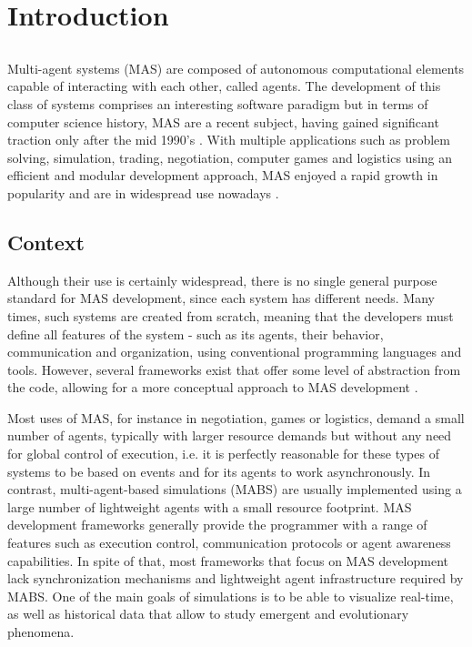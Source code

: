 \chapter{Introduction}
\label{chap:intro}

\section*{}

Multi-agent systems (MAS) are composed of autonomous computational elements capable of interacting with each other, called agents. The development of this class of systems comprises an interesting software paradigm but in terms of computer science history, MAS are a recent subject, having gained significant traction only after the mid 1990's \cite{wooldridge2008introduction}. With multiple applications such as problem solving, simulation, trading, negotiation, computer games and logistics using an efficient and modular development approach, MAS enjoyed a rapid growth in popularity and are in widespread use nowadays \cite{ferber1999multi}.

\section{Context}

Although their use is certainly widespread, there is no single general purpose standard for MAS development, since each system has different needs. Many times, such systems are created from scratch, meaning that the developers must define all features of the system - such as its agents, their behavior, communication and organization, using conventional programming languages and tools. However, several frameworks exist that offer some level of abstraction from the code, allowing for a more conceptual approach to
MAS development \cite{gormer2011jrep}. 

Most uses of MAS, for instance in negotiation, games or logistics, demand a small number of agents, typically with larger resource demands but without any need for global control of execution, i.e. it is perfectly reasonable for these types of systems to be based on events and for its agents to work asynchronously. In contrast, multi-agent-based simulations (MABS) are usually implemented using a large number of lightweight agents with a small resource footprint. MAS development frameworks generally provide the programmer with a range of features such as execution control, communication protocols or agent awareness capabilities. In spite of that, most frameworks that focus on MAS development lack synchronization mechanisms and lightweight agent infrastructure required by MABS. One of the main goals of simulations is to be able to visualize real-time, as well as historical data that allow to study emergent and evolutionary phenomena. \cite{mengistu2008scalability}



